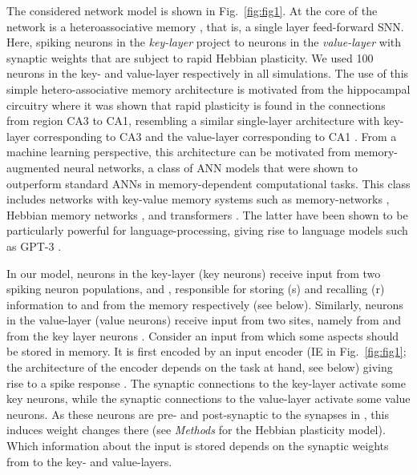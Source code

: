 \documentclass{article}
\begin{document}
The considered network model is shown in Fig.~\ref{fig:fig1}. At the core of the network is a heteroassociative memory \cite{willshaw1969non}, that is, a single layer feed-forward SNN. Here, spiking neurons  in the {\em key-layer} project to neurons  in the {\em value-layer} with synaptic weights  that are subject to rapid Hebbian plasticity. We used \num{100} neurons in the key- and value-layer respectively in all simulations. The use of this simple hetero-associative memory architecture is motivated from the hippocampal circuitry where it was shown that rapid plasticity is found in the connections from region CA3 to CA1, resembling a similar single-layer architecture with key-layer corresponding to CA3 and the value-layer corresponding to CA1 \cite{bittner2017behavioral,zhao2022rapid}. From a machine learning perspective, this architecture can be motivated from memory-augmented neural networks, a class of \gls{ANN} models that were shown to outperform standard \glspl{ANN} in memory-dependent computational tasks. This class includes networks with key-value memory systems such as memory-networks \cite{weston2015towards,sukhbaatar2015end}, Hebbian memory networks \cite{limbacher2020hmem}, and transformers \cite{vaswani2017attention}. The latter have been shown to be particularly powerful for language-processing, giving rise to language models such as GPT-3 \cite{brown2020language}.

In our model, neurons in the key-layer (key neurons) receive input from two spiking neuron populations,  and , 
responsible for storing (s) and recalling (r) information to and from the memory respectively (see below).
Similarly, neurons in the value-layer (value neurons) receive input from two sites, namely from  and from the key layer neurons .
Consider an input  from which some aspects should be stored in memory. It is first encoded by an input encoder (IE in Fig.~\ref{fig:fig1}; the architecture of the encoder depends on the task at hand, see below) giving rise to a spike response . The synaptic connections to the key-layer activate some key neurons, while the synaptic connections to the value-layer activate some value neurons. As these neurons are pre- and post-synaptic to the synapses in  , this induces weight changes there (see \emph{Methods} for the Hebbian plasticity model). Which information about the input  is stored depends on the synaptic weights from  to the key- and value-layers.
\end{document}
